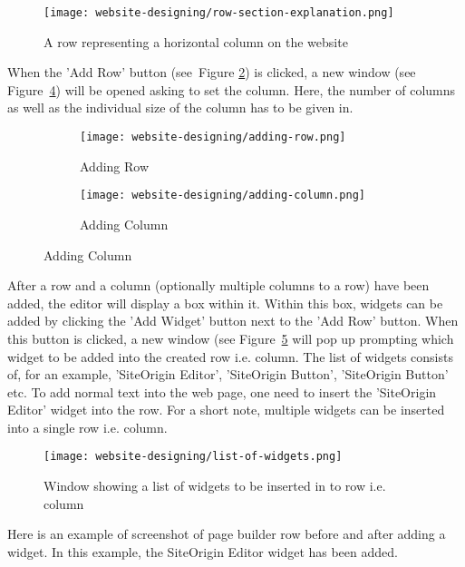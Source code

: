 \begin{figure}[ht]
\centering
\caption{A row representing a horizontal column on the website}
\label{row-section-explanation}
\texttt{[image: website-designing/row-section-explanation.png]}
\end{figure}

When the 'Add Row' button (see~Figure \ref{adding-row}) is clicked, a new window (see Figure~\ref{adding-column}) will be opened asking to set the column. Here, the number of columns as well as the individual size of the column has to be given in.

\begin{figure}[ht]
\centering
	\begin{subfigure}{.49\linewidth}
	\centering
	\caption{Adding Row}
	\label{adding-row}
	\texttt{[image: website-designing/adding-row.png]}
	\end{subfigure}
	\begin{subfigure}{0.49\linewidth}
	\centering
	\caption{Adding Column}
	\label{adding-column}
	\texttt{[image: website-designing/adding-column.png]}
	\end{subfigure}
\end{figure}

After a row and a column (optionally multiple columns to a row) have been added, the editor will display a box within it. Within this box, widgets can be added by clicking the 'Add Widget' button next to the 'Add Row' button. When this button is clicked, a new window (see Figure~\ref{list-of-widgets} will pop up prompting which widget to be added into the created row i.e. column. The list of widgets consists of, for an example, 'SiteOrigin Editor', 'SiteOrigin Button', 'SiteOrigin Button' etc. To add normal text into the web page, one need to insert the 'SiteOrigin Editor' widget into the row. For a short note, multiple widgets can be inserted into a single row i.e. column.

\begin{figure}[ht]
\centering
\caption{Window showing a list of widgets to be inserted in to row i.e. column}
\label{list-of-widgets}
\texttt{[image: website-designing/list-of-widgets.png]}
\end{figure}

Here is an example of screenshot of page builder row before and after adding a widget. In this example, the SiteOrigin Editor widget has been added.

